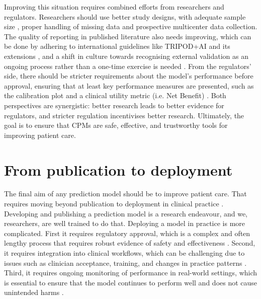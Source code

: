 Improving this situation requires combined efforts from researchers and regulators. Researchers should use better study designs, with adequate sample size \cite{rileyMinimumSampleSize2021}, proper handling of missing data and prospective multicenter data collection. The quality of reporting in published literature also needs improving, which can be done by adhering to international guidelines like \gls{TRIPOD}+AI and its extensions \cite{collinsTRIPODAIStatementUpdated2024,debrayTransparentReportingMultivariable2023, snellTransparentReportingMultivariable2023}, and a shift in culture towards recognising external validation as an ongoing process rather than a one-time exercise is needed \cite{vancalsterThereNoSuch2023}. From the regulators' side, there should be stricter requirements about the model's performance before approval, ensuring that at least key performance measures are presented, such as the calibration plot and a clinical utility metric (i.e. Net Benefit) \cite{vancalsterPerformanceEvaluationPredictive2024, ShowUsEvidence2026}. Both perspectives are synergistic: better research leads to better evidence for regulators, and stricter regulation incentivises better research. Ultimately, the goal is to ensure that \glspl{CPM} are safe, effective, and trustworthy tools for improving patient care.

\section{From publication to deployment}

The final aim of any prediction model should be to improve patient care. That requires moving beyond publication to deployment in clinical practice \cite{van2026enemies}. Developing and publishing a prediction model is a research endeavour, and we, researchers, are well trained to do that. Deploying a model in practice is more complicated. First it requires regulatory approval, which is a complex and often lengthy process that requires robust evidence of safety and effectiveness \cite{muehlematterApprovalArtificialIntelligence2021}. Second, it requires integration into clinical workflows, which can be challenging due to issues such as clinician acceptance, training, and changes in practice patterns \cite{kellyKeyChallengesDelivering2019}. Third, it requires ongoing monitoring of performance in real-world settings, which is essential to ensure that the model continues to perform well and does not cause unintended harms \cite{finlaysonClinicianDatasetShift2021}.  


